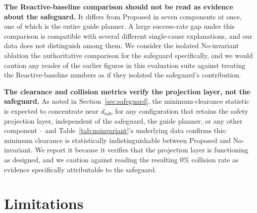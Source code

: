 \documentclass[conference,letterpaper,10pt]{ieeeconf}
\begin{document}
\textbf{The Reactive-baseline comparison should not be read as evidence
about the safeguard.} It differs from Proposed in seven components at
once, one of which is the entire guide planner. A large success-rate gap
under this comparison is compatible with several different single-cause
explanations, and our data does not distinguish among them. We consider
the isolated No-invariant ablation the authoritative comparison for the
safeguard specifically, and we would caution any reader of the earlier
figures in this evaluation suite against treating the Reactive-baseline
numbers as if they isolated the safeguard's contribution.

\textbf{The clearance and collision metrics verify the projection layer,
not the safeguard.} As noted in Section~\ref{sec:safeguard}, the
minimum-clearance statistic is expected to concentrate near
\(d_{\text{safe}}\) for any configuration that retains the safety
projection layer, independent of the safeguard, the guide planner, or any
other component -- and Table~\ref{tab:noinvariant}'s underlying data
confirms this: minimum clearance is statistically indistinguishable
between Proposed and No-invariant. We report it because it verifies that
the projection layer is functioning as designed, and we caution against
reading the resulting 0\% collision rate as evidence specifically
attributable to the safeguard.

\section{Limitations}
\label{sec:limitations}
\end{document}
